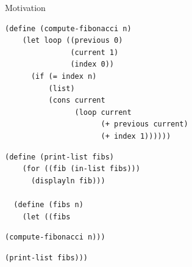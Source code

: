 \documentclass[xcolor=dvipsnames, 14pt]{beamer}
\begin{document}
\begin{frame}[fragile]{Motivation}

\begin{Verbatim}[frame=single, rulecolor=\color{red},fontsize=\footnotesize]
  (define (compute-fibonacci n)
    (let loop ((previous 0)
               (current 1)
               (index 0))
      (if (= index n)
          (list)
          (cons current
                (loop current
                      (+ previous current)
                      (+ index 1))))))
\end{Verbatim}
\begin{Verbatim}[fontsize=\scriptsize]
  (define (print-list fibs)
    (for ((fib (in-list fibs)))
      (displayln fib)))

  (define (fibs n)
    (let ((fibs
\end{Verbatim}
\begin{Verbatim}[frame=single, rulecolor=\color{red},fontsize=\footnotesize]
           (compute-fibonacci n)))
\end{Verbatim}
\begin{Verbatim}[fontsize=\scriptsize]
      (print-list fibs)))
\end{Verbatim}
\end{frame}
\end{document}
